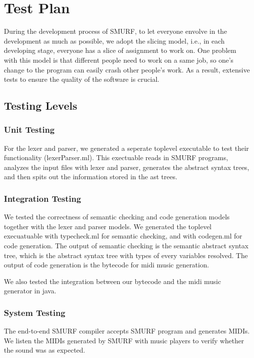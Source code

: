 \section{Test Plan}

During the development process of SMURF, to let everyone envolve in the development as much as possible, we adopt the slicing model, 
i.e., in each developing stage, everyone has a slice of assignment to work on.
One problem with this model is that different people need to work on a same job, 
so one's change to the program can easily crash other people's work. 
As a result, extensive tests to ensure the quality of the software is crucial. 

\subsection{Testing Levels}
\subsubsection{Unit Testing}
For the lexer and parser, we generated a seperate toplevel executable to test their functionality (lexerParser.ml). 
This exectuable reads in SMURF programs, analyzes the input files with lexer and parser, generates the abstract syntax trees, 
 and then spits out the information stored in the ast trees.

\subsubsection{Integration Testing}
We tested the correctness of semantic checking and code generation models together with the lexer and parser models.
We generated the toplevel execuatuable with typecheck.ml for semantic checking, and with codegen.ml for code generation. 
The output of semantic checking is the semantic abstract syntax tree, 
which is the abstract syntax tree with types of every variables resolved.
The output of code generation is the bytecode for midi music generation.

We also tested the integration between our bytecode and the midi music generator in java.

\subsubsection{System Testing}
The end-to-end SMURF compiler accepts SMURF program and generates MIDIs. 
We listen the MIDIs generated by SMURF with music players to verify whether the sound was as expected.

